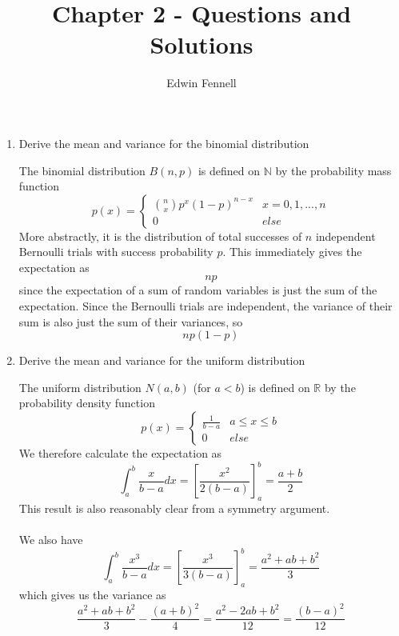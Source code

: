 \documentclass{article}
\title{Chapter 2 - Questions and Solutions}
\author{Edwin Fennell}
\date{}
\newcommand{\chapternumber}{2}
\newenvironment{QandA}{\begin{enumerate}[label=\chapternumber.\arabic*]\bfseries\boldmath}
	{\end{enumerate}}
\newenvironment{answered}{\par\bigskip\normalfont\unboldmath}{}
\begin{document}
	
	\maketitle
	
	\noindent%
	\begin{QandA}
		\item Derive the mean and variance for the binomial distribution
		\begin{answered}
			The binomial distribution $B(n,p)$ is defined on $\mathbb{N}$ by the probability mass function
			\[p(x)=
			\begin{cases}
			\binom{n}{x}p^x(1-p)^{n-x} & x = 0,1,...,n\\
			0 & else
			\end{cases}\]
			More abstractly, it is the distribution of total successes of $n$ independent Bernoulli trials with success probability $p$. This immediately gives the expectation as
			\[np\]
			since the expectation of a sum of random variables is just the sum of the expectation. Since the Bernoulli trials are independent, the variance of their sum is also just the sum of their variances, so
			\[np(1-p)\]
		\end{answered}
	
	
		\item Derive the mean and variance for the uniform distribution
		\begin{answered}
			The uniform distribution $N(a,b)$ (for $a<b$) is defined on $\mathbb{R}$ by the probability density function
			\[p(x)=
			\begin{cases}
			\frac{1}{b-a} & a\leq x\leq b\\
			0 & else
			\end{cases}
			\]
			We therefore calculate the expectation as
			\[\int_{a}^{b}\frac{x}{b-a}dx=
			\left[\frac{x^2}{2(b-a)}\right]_{a}^{b}=\frac{a+b}{2}\]
			This result is also reasonably clear from a symmetry argument.\\
			\\
			We also have
			\[\int_{a}^{b}\frac{x^3}{b-a}dx=
			\left[\frac{x^3}{3(b-a)}\right]_{a}^{b}=\frac{a^2+ab+b^2}{3}\]
			which gives us the variance as
			\[\frac{a^2+ab+b^2}{3}-\frac{(a+b)^2}{4}=\frac{a^2-2ab+b^2}{12}=\frac{(b-a)^2}{12}\]		\end{answered}
		

\end{QandA}
\end{document}
